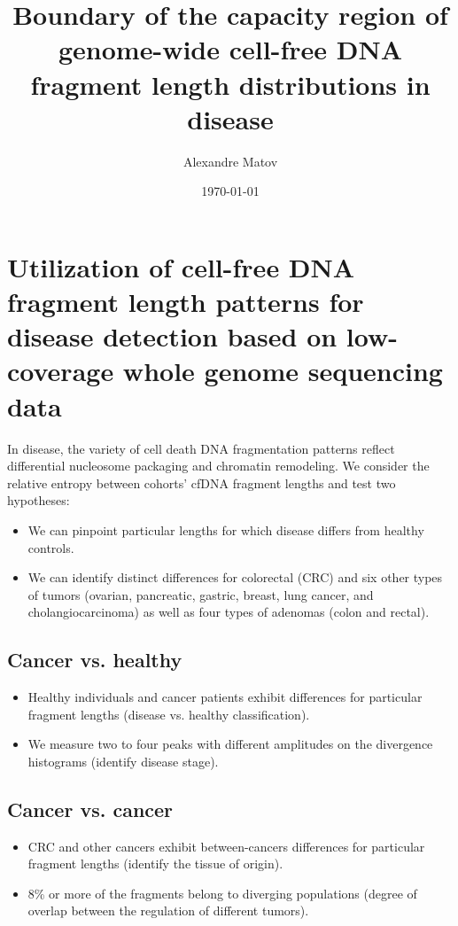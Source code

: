 \documentclass[]{revtex4}
\begin{document}
\title{Boundary of the capacity region of genome-wide cell-free DNA fragment length distributions in disease}
\author{Alexandre Matov}
\date{\today}
\maketitle

\section{ Utilization of cell-free DNA fragment length patterns for disease detection based on low-coverage whole genome sequencing data }
In disease, the variety of cell death DNA fragmentation patterns reflect differential nucleosome packaging and chromatin remodeling. 
We consider the relative entropy between cohorts’ cfDNA fragment lengths and test two hypotheses: 
\vspace {2ex}
\begin{itemize}
    \item We can pinpoint particular lengths for which disease differs from healthy controls. 
\vspace {2ex}
    \item We can identify distinct differences for colorectal (CRC) and six other types of tumors (ovarian, pancreatic, gastric, breast, lung cancer, and cholangiocarcinoma) as well as four types of adenomas (colon and rectal). 
\end{itemize}
    \subsection{Cancer vs. healthy}
    \begin{itemize}

    \item Healthy individuals and cancer patients exhibit differences for particular fragment lengths (disease vs. healthy classification). 
\vspace {2ex}
    \item We measure two to four peaks with different amplitudes on the divergence histograms (identify disease stage).
\end{itemize}

    \subsection{ Cancer vs. cancer}
\begin{itemize}

    \item CRC and other cancers exhibit between-cancers differences for particular fragment lengths (identify the tissue of origin).  

    \item 8\% or more of the fragments belong to diverging populations (degree of overlap between the regulation of different tumors). 
    
\end{itemize}
\end{document}
